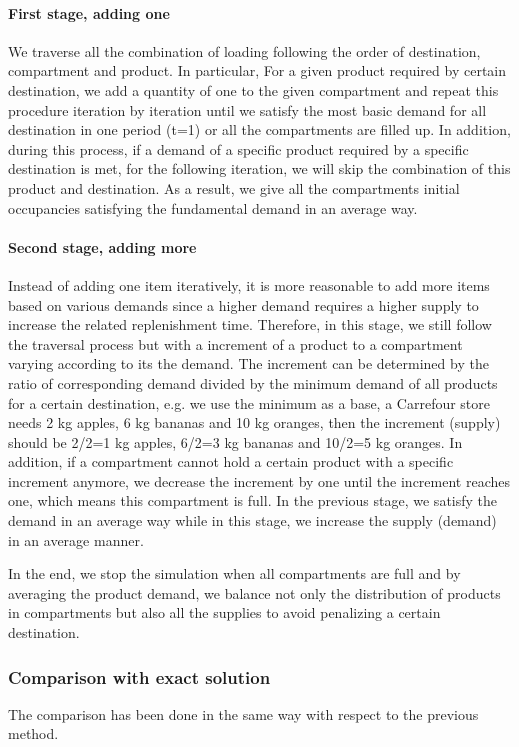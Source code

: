 \documentclass{article}
\begin{document}
\paragraph{First stage, adding one}
We traverse all the combination of loading following the order of destination, compartment and product. In particular, For a given product required by certain destination, we add a quantity of one to the given compartment and repeat this procedure iteration by iteration until we satisfy the most basic demand for all destination in one period (t=1) or all the compartments are filled up. In addition, during this process, if a demand of a specific product required by a specific destination is met, for the following iteration, we will skip the combination of this product and destination. As a result, we give all the compartments initial occupancies satisfying the fundamental demand in an average way.
\paragraph{Second stage, adding more}
Instead of adding one item iteratively, it is more reasonable to add more items based on various demands since a higher demand requires a higher supply to increase the related replenishment time. Therefore, in this stage, we still follow the traversal process but with a increment of a product to a compartment varying according to its the demand. The increment can be determined by the ratio of corresponding demand divided by the minimum demand of all products for a certain destination, e.g. we use the minimum as a base, a Carrefour store needs 2 kg apples, 6 kg bananas and 10 kg oranges, then the increment (supply) should be 2/2=1 kg apples, 6/2=3 kg bananas and 10/2=5 kg oranges. In addition, if a compartment cannot hold a certain product with a specific increment anymore, we decrease the increment by one until the increment reaches one, which means this compartment is full. In the previous stage, we satisfy the demand in an average way while in this stage, we increase the supply (demand) in an average manner. 

In the end, we stop the simulation when all compartments are full and by averaging the product demand, we balance not only the distribution of products in compartments but also all the supplies to avoid penalizing a certain destination.

\subsubsection{Comparison with exact solution}
The comparison has been done in the same way with respect to the previous method. 
\end{document}
